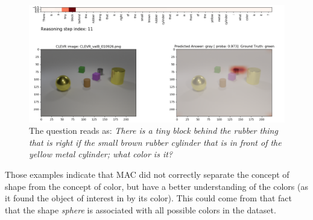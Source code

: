 \begin{figure}[]
	\centering
	\includegraphics[width=\textwidth]{img/fail_mac_cogent_b_color.png}
	\caption{The question reads as: \textit{There is a tiny block behind the rubber thing that is right if the small brown rubber cylinder that is in front of the yellow metal cylinder; what color is it?}}
	\label{fig:fail_mac_color}
\end{figure}

Those examples indicate that MAC did not correctly separate the concept of shape from the concept of color, but have a better understanding of the colors (as it found the object of interest in  by its color). This could come from that fact that the shape \textit{sphere} is associated with all possible colors in the dataset. 
